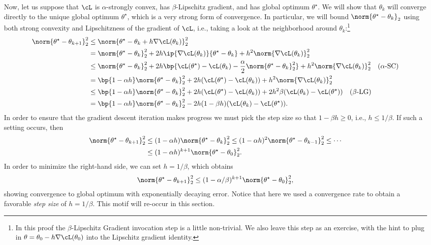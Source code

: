 \documentclass[../../book-main.tex]{subfiles}
\begin{document}
Now, let us suppose that \(\cL\) is \(\alpha\)-strongly convex, has
\(\beta\)-Lipschitz gradient, and has global optimum
\(\theta^{\star}\). We will show that \(\theta_{k}\) will converge
directly to the unique global optimum \(\theta^{\star}\), which is a
very strong form of convergence. In particular, we will bound
\(\norm{\theta^{\star} - \theta_{k}}_{2}\) using both strong
convexity and Lipschitzness of the gradient of \(\cL\), i.e., taking
a look at the neighborhood around \(\theta_{k}\):\footnote{In this
    proof the \(\beta\)-Lipschitz Gradient invocation step is a little
    non-trivial. We also leave this step as an exercise, with the hint to
    plug in \(\theta = \theta_{0} - h\nabla \cL(\theta_{0})\) into the
Lipschitz gradient identity.}
\begin{align}
    \norm{\theta^{\star} - \theta_{k + 1}}_{2}^{2}
    &\leq \norm{\theta^{\star} - \theta_{k} + h\nabla
    \cL(\theta_{k})}_{2}^{2} \\
    &= \norm{\theta^{\star} - \theta_{k}}_{2}^{2} + 2h\ip{\nabla
    \cL(\theta_{k})}{\theta^{\star} - \theta_{k}} + h^{2}\norm{\nabla
    \cL(\theta_{k})}_{2}^{2} \\
    &\leq \norm{\theta^{\star} - \theta_{k}}_{2}^{2} +
    2h\bp{\cL(\theta^{\star}) - \cL(\theta_{k}) -
    \frac{\alpha}{2}\norm{\theta^{\star} - \theta_{k}}_{2}^{2}} +
    h^{2}\norm{\nabla \cL(\theta_{k})}_{2}^{2} \quad \text{(\(\alpha\)-SC)} \\
    &= \bp{1 - \alpha h}\norm{\theta^{\star} - \theta_{k}}_{2}^{2} +
    2h(\cL(\theta^{\star}) - \cL(\theta_{k})) + h^{2}\norm{\nabla
    \cL(\theta_{k})}_{2}^{2} \\
    &\leq \bp{1 - \alpha h}\norm{\theta^{\star} - \theta_{k}}_{2}^{2}
    + 2h(\cL(\theta^{\star}) - \cL(\theta_{k})) +
    2h^{2}\beta(\cL(\theta_{k}) - \cL(\theta^{\star})) \quad
    \text{(\(\beta\)-LG)} \\
    &= \bp{1 - \alpha h}\norm{\theta^{\star} - \theta_{k}}_{2}^{2} -
    2h(1 - \beta h)(\cL(\theta_{k}) - \cL(\theta^{\star})).
\end{align}
In order to ensure that the gradient descent iteration makes progress
we must pick the step size so that \(1 - \beta h \geq 0\), i.e., \(h
\leq 1/\beta\). If such a setting occurs, then
\begin{align}
    \norm{\theta^{\star} - \theta_{k + 1}}_{2}^{2}
    &\leq (1 - \alpha h)\norm{\theta^{\star} - \theta_{k}}_{2}^{2}
    \leq (1 - \alpha h)^{2}\norm{\theta^{\star} - \theta_{k -
    1}}_{2}^{2} \leq \cdots \\
    &\leq (1 - \alpha h)^{k + 1}\norm{\theta^{\star} - \theta_{0}}_{2}^{2}.
\end{align}
In order to minimize the right-hand side, we can set \(h = 1/\beta\),
which obtains
\begin{equation}
    \norm{\theta^{\star} - \theta_{k + 1}}_{2}^{2} \leq (1 -
    \alpha/\beta)^{k + 1}\norm{\theta^{\star} - \theta_{0}}_{2}^{2},
\end{equation}
showing convergence to global optimum with exponentially decaying
error. Notice that here we used a convergence rate to obtain a
favorable \textit{step size} of \(h = 1/\beta\). This motif will
re-occur in this section.
\end{document}
